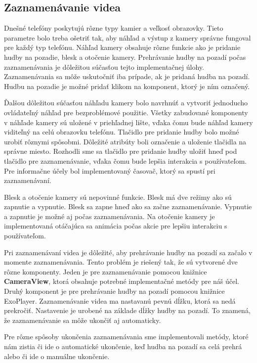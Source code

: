\documentclass[12pt, oneside]{book}
\begin{document}
\subsection{Zaznamenávanie videa}

\hspace{15pt} Dnešné telefóny poskytujú rôzne typy kamier a veľkosť obrazovky. Tieto parametre bolo treba ošetriť tak, aby náhľad a výstup z kamery správne fungoval pre každý typ telefónu. Náhľad kamery obsahuje rôzne funkcie ako je pridanie hudby na pozadie, blesk a otočenie kamery. Prehrávanie hudby na pozadí počas zaznamenávania je dôležitou súčasťou tejto implementačnej úlohy. Zaznamenávania sa môže uskutočniť iba prípade, ak je pridaná hudba na pozadí. Hudbu na pozadie je možné pridať klikom na komponent, ktorý je ním označený. 

Ďalšou dôležitou súčasťou náhľadu kamery bolo navrhnúť a vytvoriť jednoducho ovládateľný náhľad pre bezproblémové použitie. Všetky zabudované komponenty v náhľade kamery sú uložené v priehľadnej lište, vďaka čomu bude náhľad kamery viditeľný na celú obrazovku telefónu. Tlačidlo pre pridanie hudby bolo možné urobiť rôznymi spôsobmi. Dôležité atribúty boli označenie a uloženie tlačidla na správne miesto. Rozhodli sme sa tlačidlo pre pridanie hudby uložiť hneď pod tlačidlo pre zaznamenávanie, vďaka čomu bude lepšia interakcia s používateľom. Pre informačne účely bol implementovaný časovač, ktorý sa spustí pri zaznamenávaní. 

Blesk a otočenie kamery sú nepovinné funkcie. Blesk má dve režimy ako sú zapnutie a vypnutie. Blesk sa zapne hneď ako sa začne zaznamenávanie. Vypnutie a zapnutie je možné aj počas zaznamenávania. Na otočenie kamery je implementovaná otáčajúca sa animácia počas akcie pre lepšiu interakciu s používateľom. 

Pri zaznamenávaní videa je dôležité, aby prehrávanie hudby na pozadí sa začalo v momente zaznamenávania. Tento problém je riešený tak, že sú vytvorené dve rôzne komponenty. Jeden je pre zaznamenávanie pomocou knižnice \textbf{CameraView}, ktorá obsahuje potrebné implementačné metódy pre náš účel. Druhý komponent je pre prehrávanie hudby na pozadí pomocou knižnice ExoPlayer. Zaznamenávanie videa ma nastavanú pevnú dĺžku, ktorá sa nedá prekročiť. Nastavenie je urobené na základe dĺžky hudby na pozadí. To znamená, že zaznamenávanie sa môže ukončiť aj automaticky.

Pre rôzne spôsoby ukončenia zaznamenávania sme implementovali metódy, ktoré nám zistia či ide o automatické ukončenie, keď hudba na pozadí sa celá prehrá alebo či ide o manuálne ukončenie.
\end{document}
